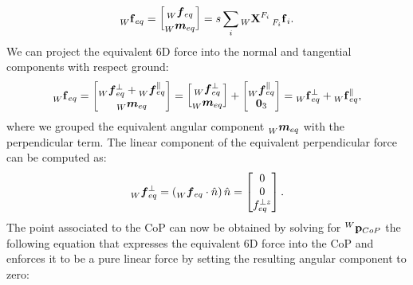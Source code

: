 %
\begin{equation*}
    \forcesix[W]_{eq} =
    \begin{bmatrix}
        \forcelin[W]_{eq} \\ \forceang[W]_{eq}
    \end{bmatrix}
    =s
    \sum_{i} \transfor[W]^{F_i} \forcesix[{F_i}]_i
    .
\end{equation*}
%
We can project the equivalent 6D force into the normal and tangential components with respect ground:
%
\begin{equation*}
    \forcesix[W]_{eq}
    =
    \begin{bmatrix}
        \forcelin[W]_{eq}^\perp + \forcelin[W]_{eq}^\parallel \\
        \forceang[W]_{eq}
    \end{bmatrix}
    =
    \begin{bmatrix}
        \forcelin[W]_{eq}^\perp \\
        \forceang[W]_{eq}
    \end{bmatrix}
    +
    \begin{bmatrix}
        \forcelin[W]_{eq}^\parallel \\
        \zeros_3
    \end{bmatrix}
    =
    \forcesix[W]_{eq}^\perp + \forcesix[W]_{eq}^\parallel
    ,
\end{equation*}
%
where we grouped the equivalent angular component $\forceang[W]_{eq}$ with the perpendicular term.
The linear component of the equivalent perpendicular force can be computed as:
%
\begin{equation*}
    \forcelin[W]_{eq}^\perp = (\forcelin[W]_{eq} \cdot \hat{n}) \, \hat{n} =
    \begin{bmatrix}
        0 \\ 0 \\ f_{eq}^{\perp z}
    \end{bmatrix}
    .
\end{equation*}
%
The point associated to the \ac{CoP} can now be obtained by solving for $\pos[W]_{CoP}$ the following equation that expresses the equivalent 6D force into the \ac{CoP} and enforces it to be a pure linear force by setting the resulting angular component to zero:
%
